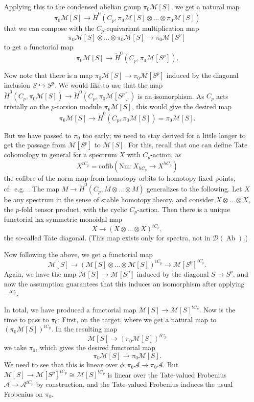 \documentclass[11pt]{amsbook}
\DeclareMathOperator{\Ab}{Ab}
\numberwithin{equation}{section}
\numberwithin{theorem}{section}
\theoremstyle{definition}
\begin{document}
Applying this to the condensed abelian group $\pi_0 \mathcal M[S]$, we get a natural map
\[
\pi_0 \mathcal M[S]\to \check{H}^0(C_p,\pi_0 \mathcal M[S]\otimes\ldots\otimes \pi_0 \mathcal M[S])
\]
that we can compose with the $C_p$-equivariant multiplication map
\[
\pi_0 \mathcal M[S]\otimes\ldots\otimes \pi_0 \mathcal M[S]\to \pi_0 \mathcal M[S^p]
\]
to get a functorial map
\[
\pi_0 \mathcal M[S]\to \check{H}^0(C_p,\pi_0 \mathcal M[S^p]).
\]

Now note that there is a map $\pi_0 \mathcal M[S]\to \pi_0 \mathcal M[S^p]$ induced by the diagonal inclusion $S\hookrightarrow S^p$. We would like to use that the map $\check{H}^0(C_p,\pi_0 \mathcal M[S])\to \check{H}^0(C_p,\pi_0 \mathcal M[S^p])$ is an isomorphism. As $C_p$ acts trivially on the $p$-torsion module $\pi_0\mathcal M[S]$, this would give the desired map
\[
\pi_0 \mathcal M[S]\to \check{H}^0(C_p,\pi_0 \mathcal M[S]) = \pi_0 \mathcal M[S].
\]

But we have passed to $\pi_0$ too early; we need to stay derived for a little longer to get the passage from $\mathcal M[S^p]$ to $\mathcal M[S]$. For this, recall that one can define Tate cohomology in general for a spectrum $X$ with $C_p$-action, as
\[
X^{tC_p} =\mathrm{cofib}(\mathrm{Nm}: X_{hC_p}\to X^{hC_p})
\]
the cofibre of the norm map from homotopy orbits to homotopy fixed points, cf.~e.g.~\cite[Chapter I]{NikolausScholze}. The map $M\to \check{H}^0(C_p,M\otimes\ldots\otimes M)$ generalizes to the following. Let $X$ be any spectrum in the sense of stable homotopy theory, and consider $X\otimes\ldots\otimes X$, the $p$-fold tensor product, with the cyclic $C_p$-action. Then there is a unique functorial lax symmetric monoidal map
\[
X\to (X\otimes\ldots\otimes X)^{tC_p},
\]
the so-called Tate diagonal. (This map exists only for spectra, not in $\mathcal D(\Ab)$.)

Now following the above, we get a functorial map
\[
\mathcal M[S]\to (\mathcal M[S]\otimes\ldots\otimes \mathcal M[S])^{tC_p}\to \mathcal M[S^p]^{tC_p}.
\]
Again, we have the map $\mathcal M[S]\to \mathcal M[S^p]$ induced by the diagonal $S\to S^p$, and now the assumption guarantees that this induces an isomorphism after applying $-^{tC_p}$.

In total, we have produced a functorial map $\mathcal M[S]\to \mathcal M[S]^{tC_p}$. Now is the time to pass to $\pi_0$: First, on the target, where we get a natural map to $(\pi_0 \mathcal M[S])^{tC_p}$. In the resulting map
\[
\mathcal M[S]\to (\pi_0 \mathcal M[S])^{tC_p}
\]
we take $\pi_0$, which gives the desired functorial map
\[
\pi_0 \mathcal M[S]\to \pi_0 \mathcal M[S].
\]
We need to see that this is linear over $\phi: \pi_0\mathcal A\to \pi_0\mathcal A$. But $\mathcal M[S]\to \mathcal M[S^p]^{tC_p}\cong \mathcal M[S]^{tC_p}$ is linear over the Tate-valued Frobenius $\mathcal A\to \mathcal A^{tC_p}$ by construction, and the Tate-valued Frobenius induces the usual Frobenius on $\pi_0$.
\end{document}
